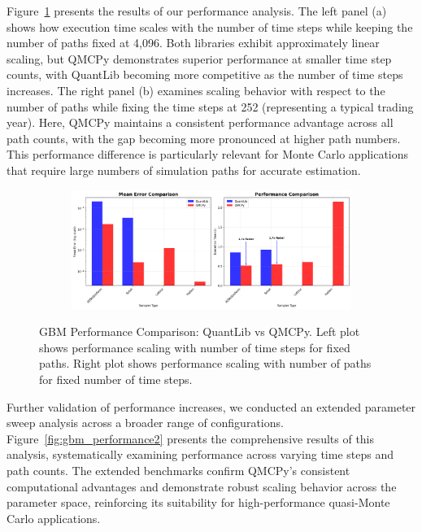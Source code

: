 Figure~\ref{fig:gbm_performance} presents the results of our performance
analysis. The left panel (a) shows how execution time scales with the number of
time steps while keeping the number of paths fixed at 4,096. Both libraries
exhibit approximately linear scaling, but QMCPy demonstrates superior
performance at smaller time step counts, with QuantLib becoming more competitive
as the number of time steps increases. The right panel (b) examines scaling
behavior with respect to the number of paths while fixing the time steps at 252
(representing a typical trading year). Here, QMCPy maintains a consistent
performance advantage across all path counts, with the gap becoming more
pronounced at higher path numbers. This performance difference is particularly
relevant for Monte Carlo applications that require large numbers of simulation
paths for accurate estimation.

\begin{figure}[H]
    \centering
    \begin{subfigure}{1\textwidth}
        \centering
        \includegraphics[width=\textwidth]{GBM/images/figure_6.png}
    \end{subfigure}
    \caption{GBM Performance Comparison: QuantLib vs QMCPy. Left plot shows performance scaling with number of time steps for fixed paths. Right plot shows performance scaling with number of paths for fixed number of time steps.}
    \label{fig:gbm_performance}
\end{figure}

Further validation of performance increases, we conducted an extended parameter
sweep analysis across a broader range of configurations.
Figure~\ref{fig:gbm_performance2} presents the comprehensive results of this
analysis, systematically examining performance across varying time steps and
path counts. The extended benchmarks confirm QMCPy's consistent computational
advantages and demonstrate robust scaling behavior across the parameter space,
reinforcing its suitability for high-performance quasi-Monte Carlo applications.

